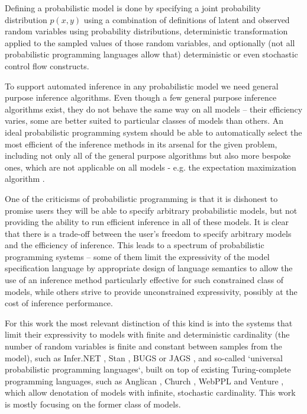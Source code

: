 \documentclass[12pt]{article}
\begin{document}
Defining a probabilistic model is done by specifying a joint probability distribution $p(x,y)$ using a combination of 
definitions of latent and observed random variables using probability distributions, 
deterministic transformation applied to the sampled values of those random variables, 
and optionally (not all probabilistic programming languages 
allow that) 
deterministic or even stochastic control flow constructs.  

To support automated inference in any probabilistic model we need general purpose inference algorithms.
Even though a few general purpose inference algorithms exist, they do not behave the same way on all models -- their efficiency varies, some are better suited to particular classes of models than others.
An ideal probabilistic programming system should be able to automatically select the most efficient of the inference methods in its arsenal for the given problem, including not only all of the general purpose algorithms but also more bespoke ones, which are not applicable on all models - e.g. the expectation maximization algorithm \citep{EM}.

One of the criticisms of probabilistic programming is that it is dishonest to promise users they will be able to specify arbitrary probabilistic models, but not providing the ability to run efficient inference in all of these models.
It is clear that there is a trade-off between the user's freedom to specify arbitrary models and the efficiency of inference.
This leads to a spectrum of probabilistic programming systems -- some of them limit the expressivity of the model specification language by appropriate design of language semantics to allow the use of an inference method particularly effective for such constrained class of models, while others strive to provide unconstrained expressivity, possibly at the cost of inference performance.

For this work the most relevant distinction of this kind is into the systems that limit their expressivity to models with finite and deterministic cardinality (the number of random variables is finite and constant between samples from the model), such as Infer.NET \citep{InferNET}, Stan \citep{Stan}, BUGS \citep{WinBUGS,BUGSproject} or JAGS \citep{JAGS}, 
and so-called `universal probabilistic programming languages`, built on top of existing Turing-complete programming languages, such as Anglican \citep{anglican}, Church \citep{GoodmanEtAl2008}, WebPPL \citep{GoodmanStuhlmuller2014} and Venture \citep{venture},
which allow denotation of models with infinite, stochastic cardinality.
This work is mostly focusing on the former class of models.
\end{document}
